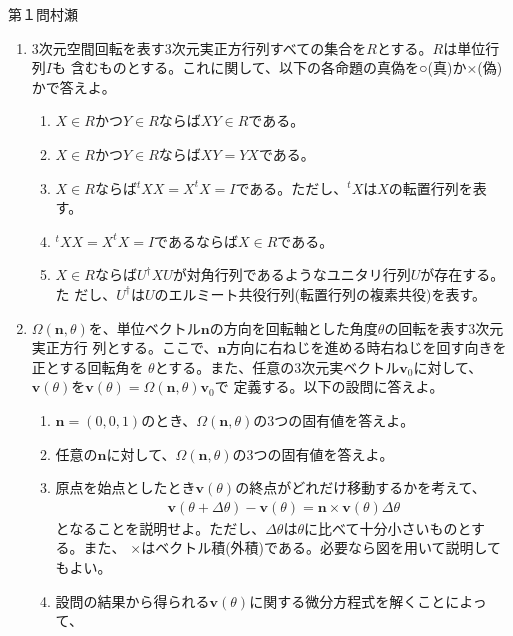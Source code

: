 \begin{question}{第１問}{村瀬}
\begin{enumerate}
\item
  3次元空間回転を表す3次元実正方行列すべての集合を$R$とする。$R$は単位行列$I$も
  含むものとする。これに関して、以下の各命題の真偽を○(真)か×(偽)かで答えよ。
  \begin{enumerate}
    \def\theenumii{\alph{enumii}}
    \def\labelenumii{(\theenumii)}
  \item $X\in R$かつ$Y\in R$ならば$XY\in R$である。
  \item $X\in R$かつ$Y\in R$ならば$XY=YX$である。
  \item $X\in R$ならば$^tXX=X^tX=I$である。ただし、$^tX$は$X$の転置行列を表す。
  \item $^tXX=X^tX=I$であるならば$X\in R$である。
  \item $X\in R$ならば$U^\dag XU$が対角行列であるようなユニタリ行列$U$が存在する。た
    だし、$U^\dag$は$U$のエルミート共役行列(転置行列の複素共役)を表す。
  \end{enumerate}
\item
  $\Omega(\bm{n},\theta)$を、単位ベクトル$\bm{n}$の方向を回転軸とした角度$\theta$の回転を表す3次元実正方行
  列とする。ここで、$\bm{n}$方向に右ねじを進める時右ねじを回す向きを正とする回転角を
  $\theta$とする。また、任意の3次元実ベクトル$\bm{v}_0$に対して、$\bm{v}(\theta)$を$\bm{v}(\theta)=\Omega(\bm{n},\theta)\bm{v}_0$で
  定義する。以下の設問に答えよ。
  \begin{enumerate}
  \item
    $\bm{n}=(0,0,1)$のとき、$\Omega(\bm{n},\theta)$の3つの固有値を答えよ。
  \item
    任意の$\bm{n}$に対して、$\Omega(\bm{n},\theta)$の3つの固有値を答えよ。
  \item{}
    原点を始点としたとき$\bm{v}(\theta)$の終点がどれだけ移動するかを考えて、
    \begin{align*}
      \bm{v}(\theta+\Delta\theta) - \bm{v}(\theta)
        = \bm{n}\times\bm{v}(\theta)\Delta\theta
    \end{align*}
    となることを説明せよ。ただし、$\Delta\theta$は$\theta$に比べて十分小さいものとする。また、
    $\times$はベクトル積(外積)である。必要なら図を用いて説明してもよい。
  \item{}
    設問の結果から得られる$\bm{v}(\theta)$に関する微分方程式を解くことによって、
    \begin{align*}

\end{align*}
\end{enumerate}
\end{enumerate}
\end{question}
